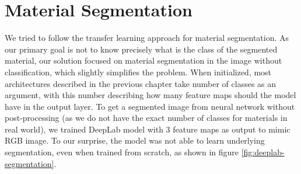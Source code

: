 \section{Material Segmentation}
We tried to follow the transfer learning approach for material segmentation. As our primary goal is not to know precisely what is the class of the segmented material, our solution focused on material segmentation in the image without classification, which slightly simplifies the problem. When initialized, most architectures described in the previous chapter take number of classes as an argument, with this number describing how many feature maps should the model have in the output layer. To get a segmented image from neural network without post-processing (as we do not have the exact number of classes for materials in real world), we trained DeepLab model with 3 feature maps as output to mimic RGB image. To our surprise, the model was not able to learn underlying segmentation, even when trained from scratch, as shown in figure \ref{fig:deeplab-segmentation}.
